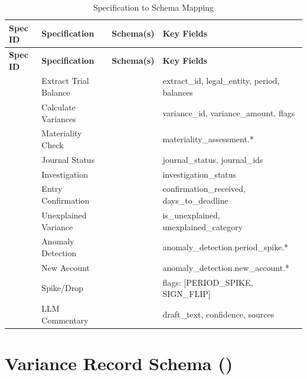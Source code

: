 \begin{longtable}{@{}C{2cm}L{4cm}C{3cm}L{4.5cm}@{}}
\caption{Specification to Schema Mapping}
\label{tab:spec-schema-mapping} \\
\toprule
\textbf{Spec ID} & \textbf{Specification} & \textbf{Schema(s)} & \textbf{Key Fields} \\
\midrule
\endfirsthead
\toprule
\textbf{Spec ID} & \textbf{Specification} & \textbf{Schema(s)} & \textbf{Key Fields} \\
\midrule
\endhead
{} & Extract Trial Balance &  & extract\_id, legal\_entity, period, balances \\
 & Calculate Variances &  & variance\_id, variance\_amount, flags \\
 & Materiality Check &  & materiality\_assessment.* \\
 & Journal Status &  & journal\_status, journal\_ids \\
 & Investigation &  & investigation\_status \\
 & Entry Confirmation &  & confirmation\_received, days\_to\_deadline \\
 & Unexplained Variance &  & is\_unexplained, unexplained\_category \\
 & Anomaly Detection &  & anomaly\_detection.period\_spike.* \\
 & New Account &  & anomaly\_detection.new\_account.* \\
 & Spike/Drop &  & flags: [PERIOD\_SPIKE, SIGN\_FLIP] \\
 & LLM Commentary &  & draft\_text, confidence, sources \\
\bottomrule
\end{longtable}

\section{Variance Record Schema ()}
\label{sec:variance-record-schema}

